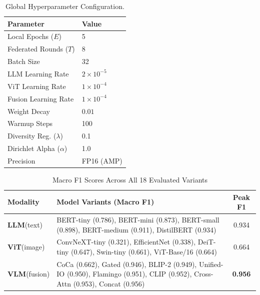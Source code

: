 \documentclass[letterpaper, conference]{IEEEtran}
\begin{document}
\begin{table}[t]
\caption{Global Hyperparameter Configuration.}
\label{tab:hyper}
\centering\footnotesize
\begin{tabular}{ll}
\toprule
\textbf{Parameter} & \textbf{Value} \\
\midrule
Local Epochs ($E$) & 5 \\
Federated Rounds ($T$) & 8 \\
Batch Size & 32 \\
LLM Learning Rate & $2 \times 10^{-5}$ \\
ViT Learning Rate & $1 \times 10^{-4}$ \\
Fusion Learning Rate & $1 \times 10^{-4}$ \\
Weight Decay & $0.01$ \\
Warmup Steps & 100 \\
Diversity Reg. ($\lambda$) & 0.1 \\
Dirichlet Alpha ($\alpha$) & 1.0 \\
Precision & FP16 (AMP) \\
\bottomrule
\end{tabular}
\end{table}

\begin{table}[t]
\caption{Macro F1 Scores Across All 18 Evaluated Variants}
\label{tab:performance_variants}
\centering
\footnotesize
\renewcommand{\arraystretch}{1.4} %
\begin{tabular}{>{\raggedright\arraybackslash}p{1.4cm} >{\raggedright\arraybackslash}p{5.2cm} c}
\toprule
\textbf{Modality} & \textbf{Model Variants (Macro F1)} & \textbf{Peak F1} \\
\midrule
\textbf{LLM}\newline(text) & BERT-tiny (0.786), BERT-mini (0.873), BERT-small (0.898), BERT-medium (0.911), DistilBERT (0.934) & 0.934 \\
\midrule
\textbf{ViT}\newline(image) & ConvNeXT-tiny (0.321), EfficientNet (0.338), DeiT-tiny (0.647), Swin-tiny (0.661), ViT-Base/16 (0.664) & 0.664 \\
\midrule
\textbf{VLM}\newline(fusion) & CoCa (0.662), Gated (0.946), BLIP-2 (0.949), Unified-IO (0.950), Flamingo (0.951), CLIP (0.952), Cross-Attn (0.953), Concat (0.956) & \textbf{0.956} \\
\bottomrule
\end{tabular}
\end{table}
\end{document}
